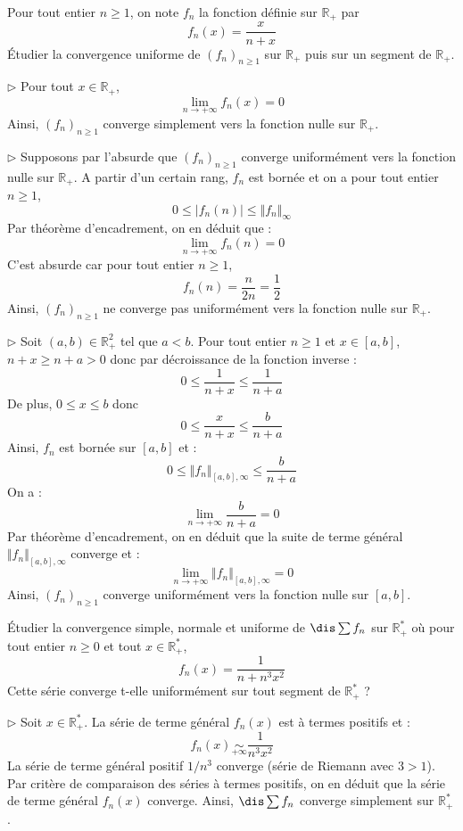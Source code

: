 \documentclass[a4paper,10pt]{report}
\begin{document}
\begin{Exa} Pour tout entier $n \geq 1$, on note $f_n$ la fonction définie sur $\mathbb{R}_+$ par 
$$ f_n(x) = \frac{x}{n+x}$$
Étudier la convergence uniforme de $(f_n)_{n \geq 1}$ sur $\mathbb{R}_+$ puis sur un segment de $\mathbb{R}_+$.
\end{Exa}

\corr 

\noindent $\rhd$ Pour tout $x \in \mathbb{R}_+$,
$$ \lim_{n \rightarrow + \infty} f_n(x) = 0$$
Ainsi, $(f_n)_{n \geq 1}$ converge simplement vers la fonction nulle sur $\mathbb{R}_+$.

\medskip

\noindent $\rhd$ Supposons par l'absurde que $(f_n)_{n \geq 1}$ converge uniformément vers la fonction nulle sur $\mathbb{R}_+$. A partir d'un certain rang, $f_n$ est bornée et on a pour tout entier $n \geq 1$,
$$ 0 \leq \vert f_n(n) \vert \leq \Vert f_n \Vert_{\infty}$$
Par théorème d'encadrement, on en déduit que :
$$ \lim_{n \rightarrow + \infty} f_n(n) = 0$$
C'est absurde car pour tout entier $n \geq 1$,
$$ f_n(n) = \dfrac{n}{2n} = \dfrac{1}{2}$$
Ainsi,  $(f_n)_{n \geq 1}$ ne converge pas uniformément vers la fonction nulle sur $\mathbb{R}_+$.

\medskip

\noindent $\rhd$ Soit $(a,b) \in \mathbb{R}_+^2$ tel que $a <b$. Pour tout entier $n \geq 1$ et $x \in [a,b]$, $n+x \geq n+a>0$ donc par décroissance de la fonction inverse :
$$ 0 \leq \dfrac{1}{n+x} \leq \dfrac{1}{n+a}$$
De plus, $0 \leq x \leq b$ donc 
$$ 0 \leq \dfrac{x}{n+x} \leq \dfrac{b}{n+a}$$
Ainsi, $f_n$ est bornée sur $[a,b]$ et :
$$ 0 \leq \Vert f_n \Vert_{[a,b],\infty} \leq \dfrac{b}{n+a}$$
On a :
$$ \lim_{n \rightarrow + \infty}  \dfrac{b}{n+a} = 0$$
Par théorème d'encadrement, on en déduit que la suite de terme général $\Vert f_n \Vert_{[a,b],\infty}$ converge et :
$$ \lim_{n \rightarrow + \infty} \Vert f_n \Vert_{[a,b],\infty} = 0$$
Ainsi, $(f_n)_{n \geq 1}$ converge uniformément vers la fonction nulle sur $[a,b]$.

\begin{Exa} Étudier la convergence simple, normale et uniforme de $\dis \sum f_n$ sur $\mathbb{R}_+^*$ où pour tout entier $n \geq 0$ et tout $x \in \mathbb{R}_+^*$, 
$$ f_n(x) = \frac{1}{n+n^3x^2}$$
Cette série converge t-elle uniformément sur tout segment de $\mathbb{R}_+^*$ ?
\end{Exa} 

\corr 

\noindent $\rhd$ Soit $x \in \mathbb{R}_+^*$. La série de terme général $f_n(x)$ est à termes positifs et :
$$ f_n(x) \underset{+ \infty}{\sim} \dfrac{1}{n^3x^2}$$
La série de terme général positif $1/n^3$ converge (série de Riemann avec $3>1$). Par critère de comparaison des séries à termes positifs, on en déduit que la série de terme général $f_n(x)$ converge. Ainsi, $\dis \sum f_n$ converge simplement sur $\mathbb{R}_+^*$.
\end{document}
